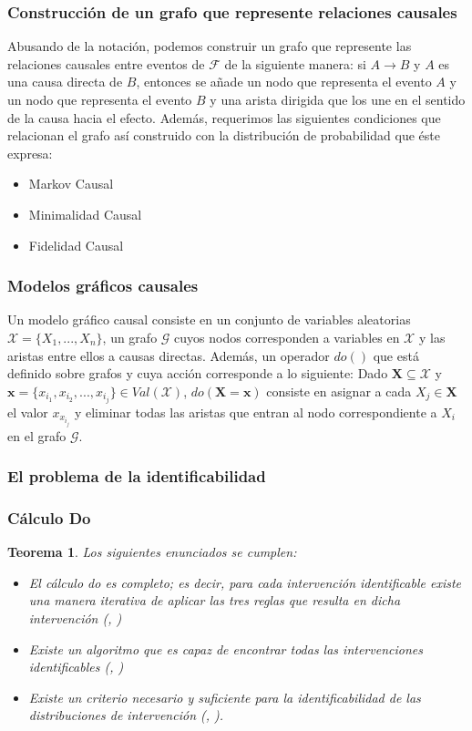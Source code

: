 \documentclass[11pt]{article}
\theoremstyle{plain}
\newtheorem{teo}{Teorema}
\begin{document}
		\subsubsection{Construcción de un grafo que represente relaciones causales}
		Abusando de la notación, podemos construir un grafo que represente las relaciones causales entre eventos de $\mathcal{F}$ de la siguiente manera: si $A \to B$ y $A$ es una causa directa de $B$, entonces se añade un nodo que representa el evento $A$ y un nodo que representa el evento $B$ y una arista dirigida que los une en el sentido de la causa hacia el efecto. Además, requerimos las siguientes condiciones que relacionan el grafo así construido con la distribución de probabilidad que éste expresa:
		\begin{itemize}
		\item Markov Causal
		\item Minimalidad Causal
		\item Fidelidad Causal
		\end{itemize}
		\subsubsection{Modelos gráficos causales}
		Un modelo gráfico causal consiste en un conjunto de variables aleatorias $\mathcal{X}=\{ X_1,...,X_n \}$, un grafo $\mathcal{G}$ cuyos nodos corresponden a variables en $\mathcal{X}$ y las aristas entre ellos a causas directas. Además, un operador $do()$ que está definido sobre grafos y cuya acción corresponde a lo siguiente: Dado $\mathbf{X} \subseteq \mathcal{X}$ y $\mathbf{x} = \{ x_{i_1}, x_{i_2}, ... , x_{i_j} \} \in Val(\mathcal{X})$, $do(\mathbf{X} = \mathbf{x} )$ consiste en asignar a cada $X_j \in \mathbf{X}$ el valor $x_{x_{i_j}}$ y eliminar todas las aristas que entran al nodo correspondiente a $X_i$ en el grafo $\mathcal{G}$.
		\subsubsection{El problema de la identificabilidad}
		
		\subsubsection{Cálculo Do}
		\begin{teo}{\cite{peters2017elements}}
		Los siguientes enunciados se cumplen:
		\begin{itemize}
		\item El cálculo do es completo; es decir, para cada intervención identificable existe una manera iterativa de aplicar las tres reglas que resulta en dicha intervención (\cite{huang2006pearl}, \cite{shpitser2006identification})
		\item Existe un algoritmo que es capaz de encontrar todas las intervenciones identificables (\cite{tian2002}, \cite{huang2006pearl})
		\item Existe un criterio necesario y suficiente para la identificabilidad de las distribuciones de intervención (\cite{shpitser2006identification}, \cite{huang2006pearl}).
		\end{itemize}
		\end{teo}
\end{document}
